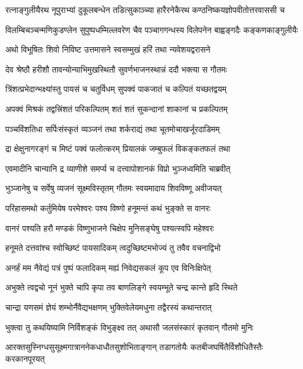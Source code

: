 \twolineshloka
{रत्नाङ्गुलीयैरथ नूपुराभ्यां दुकूलबन्धेन तडित्सुकाञ्च्या}
{हारैरनेकैरथ कण्ठनिष्कयज्ञोपवीतोत्तरवाससी च}%

\twolineshloka
{विलम्बिचञ्चन्मणिकुडण्लेन सुपुष्पधम्मिल्लवरेण चैव}
{पञ्चागगन्धस्य विलेपनेन बाह्वङ्गदैः कङ्कणकाङ्गुलीयैः}%

\twolineshloka
{अथो विभूषितः शिवो निविष्ट उत्तमासने}
{स्वसम्मुखं हरिं तथा न्यवेशयद्वरासने}%

\twolineshloka
{देव श्रेष्ठौ हरीशौ तावन्योन्याभिमुखस्थितौ}
{सुवर्णभाजनस्थान्नं ददौ भक्त्या स गौतमः}%

\twolineshloka
{त्रिंशत्प्रभेदान्भक्ष्यांस्तु पायसं च चतुर्विधम्}
{सुपक्वं पाकजातं च कल्पितं यच्छतद्वयम्}%

\twolineshloka
{अपक्वं मिश्रकं तद्वत्त्रिंशतं परिकल्पितम्}
{शतं शतं सुकन्दानां शाकानां च प्रकल्पितम्}%

\twolineshloka
{पञ्चविंशतिधा सर्पिःसंस्कृतं व्यञ्जनं तथा}
{शर्कराद्यं तथा चूतमोचाखर्जूरदाडिमम्}%

\twolineshloka
{द्रा क्षेक्षुनागरङ्गं च मिष्टं पक्वं फलोत्करम्}
{प्रियालकं जम्बुफलं विकङ्कतफलं तथा}%

\twolineshloka
{एवमादीनि चान्यानि द्र व्याणीशे समर्प्य च}
{दत्त्वापोशानकं विप्रो भुञ्जध्वमिति चाब्रवीत्}%

\twolineshloka
{भुञ्जानेषु च सर्वेषु व्यजनं सूक्ष्मविस्तृतम्}
{गौतमः स्वयमादाय शिवविष्णू अवीजयत्}%

\twolineshloka
{परिहासमथो कर्तुमियेष परमेश्वरः}
{पश्य विष्णो हनूमन्तं कथं भुङ्क्ते स वानरः}%

\twolineshloka
{वानरं पश्यति हरौ मण्डकं विष्णुभाजने}
{चिक्षेप मुनिसङ्घेषु पश्यत्स्वपि महेश्वरः}%

\twolineshloka
{हनूमते दत्तवांश्च स्वोच्छिष्टं पायसादिकम्}
{त्वदुच्छिष्टमभोज्यं तु तवैव वचनाद्विभो}%

\twolineshloka
{अनर्हं मम नैवेद्यं पत्रं पुष्पं फलादिकम्}
{मह्यं निवेद्यसकलं कूप एव विनिःक्षिपेत्}%

\twolineshloka
{अभुक्ते त्वद्वचो नूनं भुक्ते चापि कृपा तव}
{बाणलिङ्गे स्वयम्भूते चन्द्र कान्ते हृदि स्थिते}%

\twolineshloka
{चान्द्रा यणसमं ज्ञेयं शम्भोर्नैवैद्यभक्षणम्}
{भुक्तिवेलेयमधुना तद्वैरस्यं कथान्तरात्}%

\twolineshloka
{भुक्त्वा तु कथयिष्यामि निर्विशङ्कं विभुङ्क्ष्व तत्}
{अथासौ जलसंस्कारं कृतवान् गौतमो मुनिः}%

\twolineshloka
{आरक्तसुस्निग्धसुसूक्ष्मगात्राननेकधाधौतसुशोभिताङ्गान्}
{तडागतोयैः कतबीजघर्षितैर्विशौधितैस्तैः करकानपूरयत्}%

